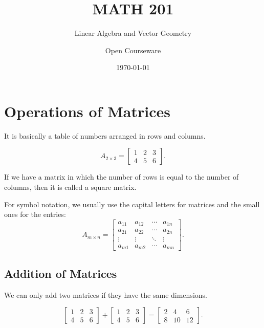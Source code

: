 \documentclass{article}
\title{MATH 201}
\subtitle{Linear Algebra and Vector Geometry}
\author{Open Courseware}
\date{\today}
\begin{document}
\mnfrontpage
\tableofcontents

\section{Operations of Matrices}

\begin{definition}[Matrix]
    It is basically a table of numbers arranged in rows and columns.
\end{definition}

\begin{example}[Matrix]
    \[
        A_{2\times3} =
        \begin{bmatrix}
            1 & 2 & 3 \\
            4 & 5 & 6
        \end{bmatrix}
    .\] 
\end{example}

If we have a matrix in which the number of rows is equal to the number of columns, then it is called a square matrix.

\begin{note}
    For symbol notation, we usually use the capital letters for matrices and the small ones for the entries:
    \[
        A_{m\times n} =
        \begin{bmatrix} 
            a_{11} & a_{12} & \cdots & a_{1n} \\
            a_{21} & a_{22} & \cdots & a_{2n} \\
            \vdots & \vdots & \ddots & \vdots \\
            a_{m1} & a_{m2} & \cdots & a_{mn}
        \end{bmatrix} 
    .\] 
\end{note}

\subsection{Addition of Matrices}

We can only add two matrices if they have the same dimensions. 

\begin{example}
    \[
        \begin{bmatrix}
            1 & 2 & 3 \\
            4 & 5 & 6
        \end{bmatrix}
        + 
        \begin{bmatrix}
            1 & 2 & 3 \\
            4 & 5 & 6
        \end{bmatrix}
        =
        \begin{bmatrix}
            2 & 4 & 6 \\
            8 & 10 & 12
        \end{bmatrix}
    .\]
\end{example}
\end{document}
